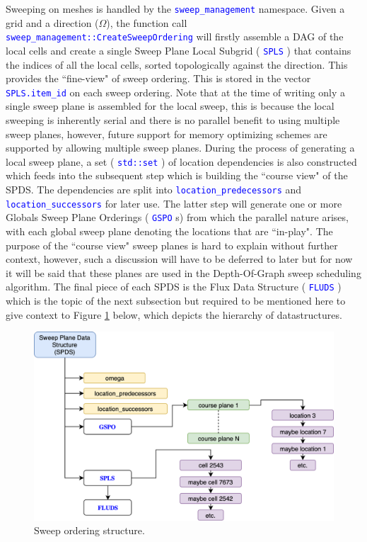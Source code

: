 \documentclass[11pt,letterpaper,titlepage]{article}
\newcommand{\xmltag}[1]{\textcolor{blue}{ \texttt{#1}} }
\numberwithin{equation}{section}
\begin{document}
Sweeping on meshes is handled by the \xmltag{sweep_management} namespace. Given a grid and a direction ($\Omega$), the function call \xmltag{sweep_management::CreateSweepOrdering} will firstly assemble a DAG of the local cells and create a single Sweep Plane Local Subgrid (\xmltag{SPLS}) that contains the indices of all the local cells, sorted topologically against the direction. This provides the ``fine-view" of sweep ordering. This is stored in the vector \xmltag{SPLS.item\_id} on each sweep ordering. Note that at the time of writing only a single sweep plane is assembled for the local sweep, this is because the local sweeping is inherently serial and there is no parallel benefit to using multiple sweep planes, however, future support for memory optimizing schemes are supported by allowing multiple sweep planes. During the  process of generating a local sweep plane, a set (\xmltag{std::set}) of location dependencies is also constructed which feeds into the subsequent step which is building the ``course view" of the SPDS. The dependencies are split into \xmltag{location\_predecessors} and \xmltag{location\_successors} for later use. The latter step will generate one or more Globals Sweep Plane Orderings (\xmltag{GSPO}s) from which the parallel nature arises, with each global sweep plane denoting the locations that are ``in-play". The purpose of the ``course view" sweep planes is hard to explain without further context, however, such a discussion will have to be deferred to later but for now it will be said that these planes are used in the Depth-Of-Graph sweep scheduling algorithm. The final piece of each SPDS is the Flux Data Structure (\xmltag{FLUDS}) which is the topic of the next subsection but required to be mentioned here to give context to Figure \ref{fig:sweepordering} below, which depicts the hierarchy of datastructures.
\vspace{0.5cm}
\begin{figure}[H]
\centering
\includegraphics[width=0.9\linewidth]{LatexDraw/SweepOrdering}
\caption{Sweep ordering structure.}
\label{fig:sweepordering}
\end{figure}
\end{document}

